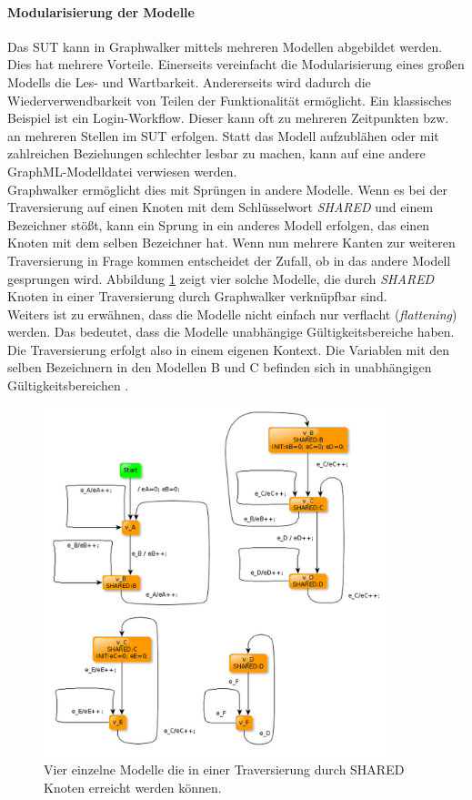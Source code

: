 \paragraph{Modularisierung der Modelle}
\label{sec:graphwalker_modularisierung}
Das \Gls{SUT} kann in Graphwalker mittels mehreren Modellen abgebildet werden. Dies hat mehrere Vorteile. Einerseits vereinfacht die Modularisierung eines großen Modells die Les- und Wartbarkeit. Andererseits wird dadurch die Wiederverwendbarkeit von Teilen der Funktionalität ermöglicht. Ein klassisches Beispiel ist ein Login-Workflow. Dieser kann oft zu mehreren Zeitpunkten bzw. an mehreren Stellen im \Gls{SUT} erfolgen. Statt das Modell aufzublähen oder mit zahlreichen Beziehungen schlechter lesbar zu machen, kann auf eine andere GraphML-Modelldatei verwiesen werden.\\
Graphwalker ermöglicht dies mit Sprüngen in andere Modelle. Wenn es bei der Traversierung auf einen Knoten mit dem Schlüsselwort \textit{SHARED} und einem Bezeichner stößt, kann ein Sprung in ein anderes Modell erfolgen, das einen Knoten mit dem selben Bezeichner hat. Wenn nun mehrere Kanten zur weiteren Traversierung in Frage kommen entscheidet der Zufall, ob in das andere Modell gesprungen wird. Abbildung \ref{fig:gw_multiple_models} zeigt vier solche Modelle, die durch \textit{SHARED} Knoten in einer Traversierung durch Graphwalker verknüpfbar sind.\\
Weiters ist zu erwähnen, dass die Modelle nicht einfach nur verflacht (\textit{flattening}) werden. Das bedeutet, dass die Modelle unabhängige Gültigkeitsbereiche haben. Die Traversierung erfolgt also in einem eigenen Kontext. Die Variablen mit den selben Bezeichnern in den Modellen B und C befinden sich in unabhängigen Gültigkeitsbereichen \cite{_graphwalker_2015}.

\begin{figure}[h] 
  \centering
     \includegraphics[width=0.9\textwidth]{figures/gw_multiple_models.png}
  \caption{Vier einzelne Modelle die in einer Traversierung durch SHARED Knoten erreicht werden können.}
  \label{fig:gw_multiple_models}
\end{figure}


